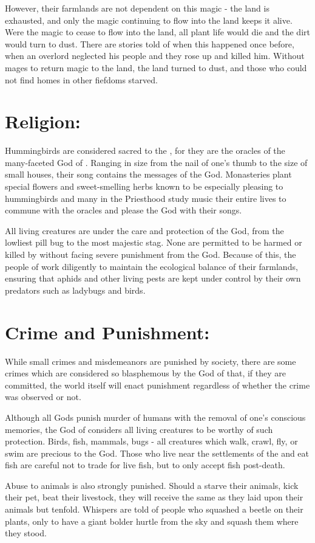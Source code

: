 \documentclass[blue]{GL2020}
\begin{document}
However, their farmlands are not dependent on this magic - the land is exhausted, and only the magic continuing to flow into the land keeps it alive.  Were the magic to cease to flow into the land, all plant life would die and the dirt would turn to dust.  There are stories told of when this happened once before, when an overlord neglected his people and they rose up and killed him.  Without mages to return magic to the land, the land turned to dust, and those who could not find homes in other fiefdoms starved.
 
\section*{Religion:}

Hummingbirds are considered sacred to the \pSunCh{}, for they are the oracles of the many-faceted God of \pSun{}.  Ranging in size from the nail of one's thumb to the size of small houses, their song contains the messages of the God.  Monasteries plant special flowers and sweet-smelling herbs known to be especially pleasing to hummingbirds and many in the Priesthood study music their entire lives to commune with the oracles and please the God with their songs.

All living creatures are under the care and protection of the God, from the lowliest pill bug to the most majestic stag.  None are permitted to be harmed or killed by \pSunCh{} without facing severe punishment from the God.  Because of this, the people of \pSunCh{} work diligently to maintain the ecological balance of their farmlands, ensuring that aphids and other living pests are kept under control by their own predators such as ladybugs and birds.  

\section*{Crime and Punishment:}

While small crimes and misdemeanors are punished by society, there are some crimes which are considered so blasphemous by the God of \pSunCh{} that, if they are committed, the world itself will enact punishment regardless of whether the crime was observed or not.

Although all Gods punish murder of humans with the removal of one's conscious memories, the God of \pSunCh{} considers all living creatures to be worthy of such protection.  Birds, fish, mammals, bugs - all creatures which walk, crawl, fly, or swim are precious to the God.  Those \pSunCh{} who live near the settlements of the \pVikings{} and eat fish are careful not to trade for live fish, but to only accept fish post-death.

Abuse to animals is also strongly punished.  Should a \pSunCh{} starve their animals, kick their pet, beat their livestock, they will receive the same as they laid upon their animals but tenfold.  Whispers are told of people who squashed a beetle on their plants, only to have a giant bolder hurtle from the sky and squash them where they stood.  
\end{document}
